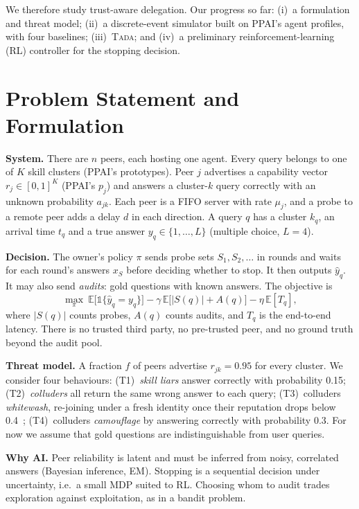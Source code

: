 \documentclass[conference]{IEEEtran}
\newcommand{\tada}{\textup{\textsc{Tada}}}
\begin{document}
We therefore study trust-aware delegation. Our progress so far: (i)~a formulation and threat model;
(ii)~a discrete-event simulator built on PPAI's agent profiles, with four baselines; (iii)~\tada{};
and (iv)~a preliminary reinforcement-learning (RL) controller for the stopping decision.

\section{Problem Statement and Formulation}
\textbf{System.} There are $n$ peers, each hosting one agent. Every query belongs to one of $K$
skill clusters (PPAI's prototypes). Peer $j$ advertises a capability vector $r_j\in[0,1]^K$
(PPAI's $p_j$) and answers a cluster-$k$ query correctly with an unknown probability $a_{jk}$.
Each peer is a FIFO server with rate $\mu_j$, and a probe to a remote peer adds a delay $d$ in each
direction. A query $q$ has a cluster $k_q$, an arrival time $t_q$ and a true answer
$y_q\in\{1,\dots,L\}$ (multiple choice, $L=4$).

\textbf{Decision.} The owner's policy $\pi$ sends probe sets $S_1,S_2,\dots$ in rounds and waits
for each round's answers $x_S$ before deciding whether to stop. It then outputs $\hat y_q$. It may
also send \emph{audits}: gold questions with known answers. The objective is
\begin{equation}
\max_\pi\ \mathbb{E}\big[\mathbb{1}\{\hat y_q=y_q\}\big]-\gamma\,\mathbb{E}\big[|S(q)|+A(q)\big]-\eta\,\mathbb{E}[T_q],
\end{equation}
where $|S(q)|$ counts probes, $A(q)$ counts audits, and $T_q$ is the end-to-end latency. There is
no trusted third party, no pre-trusted peer, and no ground truth beyond the audit pool.

\textbf{Threat model.} A fraction $f$ of peers advertise $r_{jk}=0.95$ for every cluster. We
consider four behaviours:
(T1)~\emph{skill liars} answer correctly with probability 0.15;
(T2)~\emph{colluders} all return the same wrong answer to each query;
(T3)~colluders \emph{whitewash}, re-joining under a fresh identity once their reputation drops below 0.4~\cite{whitewash};
(T4)~colluders \emph{camouflage} by answering correctly with probability 0.3.
For now we assume that gold questions are indistinguishable from user queries.

\textbf{Why AI.} Peer reliability is latent and must be inferred from noisy, correlated answers
(Bayesian inference, EM). Stopping is a sequential decision under uncertainty, i.e.\ a small MDP
suited to RL. Choosing whom to audit trades exploration against exploitation, as in a bandit problem.
\end{document}
